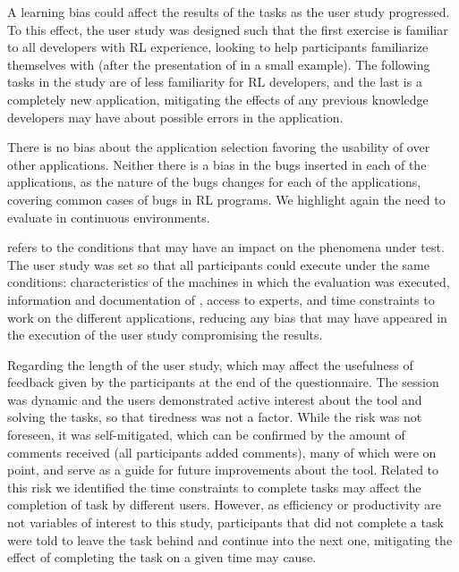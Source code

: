 \begin{description}[leftmargin=0.1cm, labelindent=0.1cm]
A learning bias could affect the results of the tasks as the user study progressed. To this effect, the  
user study was designed such that the first exercise is familiar to all developers 
with \ac{RL} experience, looking to help participants familiarize themselves with \flik (after the 
presentation of \flik in a small example). The following tasks in the study are of less familiarity for 
\ac{RL} developers, and the last is a completely new application, mitigating the effects of any 
previous knowledge developers may have about possible errors in the application. 

There is no bias about the application selection favoring the usability of \flik over other applications. 
Neither there is a bias in the bugs inserted in each of the applications, as the nature of the bugs 
changes for each of the applications, covering common cases of bugs in \ac{RL} programs. We 
highlight again the need to evaluate \flik in continuous environments.

\item[Threats to internal validity] refers to the conditions that may have an impact on the 
phenomena under test. The user study was set so that all participants could execute under the 
same conditions: characteristics of the machines in which the evaluation was executed, information 
and documentation of \flik, access to \flik experts, and time constraints to work on the different 
applications, reducing any bias that may have appeared in the execution of the user study 
compromising the results.

Regarding the length of the user study, which may affect the usefulness of feedback given by the 
participants at the end of the questionnaire. The session was dynamic and the users demonstrated 
active interest about the tool and solving the tasks, so that tiredness was not a factor. While the risk was 
not foreseen, it was self-mitigated, which can be confirmed by the amount of comments received (all 
participants added comments), many of which were on point, and serve as a guide for future 
improvements about the tool. Related to this risk we identified the time constraints to complete tasks 
may affect the completion of task by different users. However, as efficiency or productivity are not 
variables of interest to this study, participants that did not complete a task were told to leave the task 
behind and continue into the next one, mitigating the effect of completing the task on a given time may 
cause.
\end{description}


\endinput

